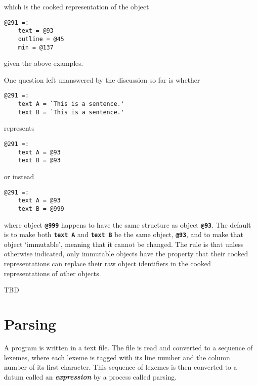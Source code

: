 \documentclass[12pt]{article}
\newcommand{\TT}[1]{{\tt \bfseries #1}}
\newcommand{\key}[1]{{\bf \em #1}\index{#1}}
\newenvironment{indpar}[1][0.3in]%
	{\begin{list}{}%
		     {\setlength{\itemsep}{0in}%
		      \setlength{\topsep}{0in}%
		      \setlength{\parsep}{1ex}%
		      \setlength{\labelwidth}{#1}%
		      \setlength{\leftmargin}{#1}%
		      \addtolength{\leftmargin}{\labelsep}}%
	 \item}%
	{\end{list}}
\begin{document}
which is the cooked representation of the object

\begin{indpar}\begin{verbatim}
@291 =:
    text = @93
    outline = @45
    min = @137
\end{verbatim}\end{indpar}

given the above examples.

One question left unanswered by the discussion so far is whether

\begin{indpar}\begin{verbatim}
@291 =:
    text A = `This is a sentence.'
    text B = `This is a sentence.'
\end{verbatim}\end{indpar}

represents

\begin{indpar}\begin{verbatim}
@291 =:
    text A = @93
    text B = @93
\end{verbatim}\end{indpar}

or instead

\begin{indpar}\begin{verbatim}
@291 =:
    text A = @93
    text B = @999
\end{verbatim}\end{indpar}

where object \TT{@999} happens to have the same structure as
object \TT{@93}.  The default is to make both \TT{text A}
and \TT{text B} be the same object, \TT{@93}, and to make
that object `immutable', meaning that it cannot be changed.  The
rule is that unless otherwise indicated, only immutable objects
have the property that their cooked representations can replace
their raw object identifiers in the cooked representations of other
objects.

TBD

\section{Parsing}
\label{PARSING}

A program is written in a text file.  The file is read and
converted to a sequence of lexemes, where each lexeme is tagged
with its line number and the column number of its first character.
This sequence of lexemes is then converted to a datum called an
\key{expression} by a process called parsing.
\end{document}
